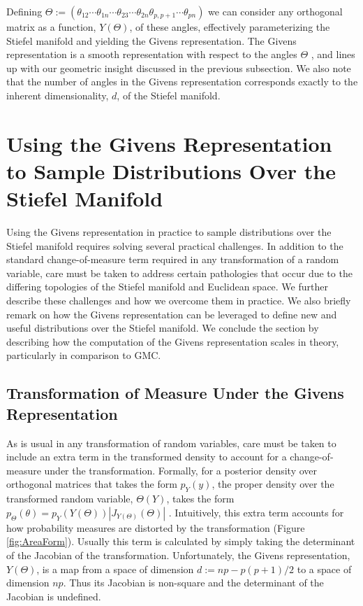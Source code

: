 \documentclass[ba]{imsart}
\numberwithin{equation}{section}
\theoremstyle{plain}
\begin{document}
\noindent Defining $\Theta := (\theta_{12} \cdots \theta_{1n} \cdots \theta_{23} \cdots \theta_{2n} \theta_{p,p+1} \cdots \theta_{pn})$ we can consider any orthogonal matrix as a function, $Y(\Theta)$, of these angles, effectively parameterizing the Stiefel manifold and yielding the Givens representation. The Givens representation is a smooth representation with respect to the angles $\Theta$ \citep{shepard2015representation}, and lines up with our geometric insight discussed in the previous subsection. We also note that the number of angles in the Givens representation corresponds exactly to the inherent dimensionality, $d$, of the Stiefel manifold.

\section{Using the Givens Representation to Sample Distributions Over the Stiefel Manifold} \label{implementation}
Using the Givens representation in practice to sample distributions over the Stiefel manifold requires solving several practical challenges. In addition to the standard change-of-measure term required in any transformation of a random variable, care must be taken to address certain pathologies that occur due to the differing topologies of the Stiefel manifold and Euclidean space. We further describe these challenges and how we overcome them in practice. We also briefly remark on how the Givens representation can be leveraged to define new and useful distributions over the Stiefel manifold. We conclude the section by describing how the computation of the Givens representation scales in theory, particularly in comparison to GMC.

\subsection{Transformation of Measure Under the Givens Representation}\label{measureGivens}
As is usual in any transformation of random variables, care must be taken to include an extra term in the transformed density to account for a change-of-measure under the transformation. Formally, for a posterior density over orthogonal matrices that takes the form $p_Y(y)$, the proper density over the transformed random variable, $\Theta(Y)$, takes the form $p_\Theta(\theta) = p_{Y}(Y(\Theta)) |J_{Y(\Theta)}(\Theta)|$ \citep{keener2011theoretical}. Intuitively, this extra term accounts for how probability measures are distorted by the transformation (Figure \ref{fig:AreaForm}). Usually this term is calculated by simply taking the determinant of the Jacobian of the transformation. Unfortunately, the Givens representation, $Y(\Theta)$, is a map from a space of dimension $d := np - p(p+1)/2$ to a space of dimension $np$. Thus its Jacobian is non-square and the determinant of the Jacobian is undefined.
\end{document}
